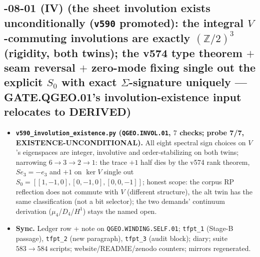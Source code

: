 \documentclass[11pt]{article}
\begin{document}
\subsection*{-08-01 (IV) (the sheet involution exists unconditionally (\texttt{v590} promoted): the integral $V$-commuting involutions are exactly $(\mathbb{Z}/2)^3$ (rigidity, both twins); the v574 type theorem $+$ seam reversal $+$ zero-mode fixing single out the explicit $S_0$ with exact $\Sigma$-signature uniquely --- GATE.QGEO.01's involution-existence input relocates to DERIVED)}
\begin{itemize}[leftmargin=1.5em]
\item \textbf{\texttt{v590\_involution\_existence.py} (\texttt{QGEO.INVOL.01}, $7$ checks;
probe 7/7, EXISTENCE-UNCONDITIONAL).} All eight spectral sign choices on $V$'s eigenspaces
are integer, involutive and order-stabilizing on both twins; narrowing $6\to3\to2\to1$:
the trace $+1$ half dies by the v574 rank theorem, $Se_3=-e_3$ and $+1$ on $\ker V$ single
out $S_0=[[1,-1,0],[0,-1,0],[0,0,-1]]$; honest scope: the corpus RP reflection does not
commute with $V$ (different structure), the alt twin has the same classification (not a bit
selector); the two demands' continuum derivation ($\mu_4$/$D_4$/$H^1$) stays the named open.
\item \textbf{Sync.} Ledger row + note on \texttt{QGEO.WINDING.SELF.01}; \texttt{tfpt\_1}
(Stage-B passage), \texttt{tfpt\_2} (new paragraph), \texttt{tfpt\_3} (audit block); diary;
suite $583\to584$ scripts; website/README/zenodo counters; mirrors regenerated.
\end{itemize}
\end{document}
